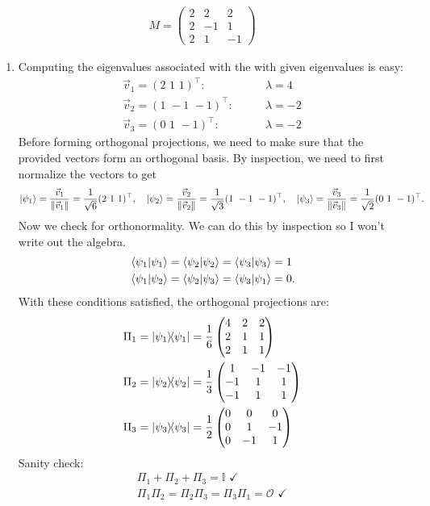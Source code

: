\documentclass{article}
\theoremstyle{definition}
\newcommand{\f}[2]{\frac{#1}{#2}}
\begin{document}
\begin{align*}
	M = \begin{pmatrix}
		2 & 2 & 2 \\
		2 & -1 & 1 \\
		2 & 1 & -1 
	\end{pmatrix}
\end{align*}
\begin{enumerate}[label=(\alph*)]
	\item Computing the eigenvalues associated with the with given eigenvalues is easy:
	\begin{align*}
		\vec{v}_1 = (2\,\,1\,\,1)^\top: &\quad\quad \lambda = 4\\
		\vec{v}_2 = (1\,\,-1\,\,-1)^\top: &\quad\quad \lambda = -2\\
		\vec{v}_3 = (0\,\,1\,\,-1)^\top: &\quad\quad \lambda = -2
	\end{align*}
	Before forming orthogonal projections, we need to make sure that the provided vectors form an orthogonal basis. By inspection, we need to first normalize the vectors to get
	\begin{align*}
		\ket{\psi_1} = \f{\vec{v}_1}{\norm{\vec{v}_1}} = \f{1}{\sqrt{6}}(2\,\,1\,\,1)^\top , 
		\quad \ket{\psi_2} = \f{\vec{v}_2}{\norm{\vec{v}_2}} = \f{1}{\sqrt{3}}  (1\,\,-1\,\,-1)^\top, 
		\quad 
		\ket{\psi_3} = \f{\vec{v}_3}{\norm{\vec{v}_3}} = \f{1}{\sqrt{2}} (0\,\,1\,\,-1)^\top.
	\end{align*}
	Now we check for orthonormality. We can do this by inspection so I won't write out the algebra. 
	\begin{align*}
		&\braket{\psi_1} = \braket{\psi_2} = \braket{\psi_3} = 1\\
		&\bra{\psi_1}\ket{\psi_2} = \bra{\psi_2}\ket{\psi_3} = \bra{\psi_3}\ket{\psi_1} = 0.
	\end{align*}
	With these conditions satisfied, the orthogonal projections are:
	\begin{align*}
		&\Pi_1 = \ketbra{\psi_1} = \f{1}{6}\begin{pmatrix}
			4 & 2 & 2 \\
			2 & 1 & 1\\
			2 & 1 & 1
		\end{pmatrix}\\
		&\Pi_2 = \ketbra{\psi_2} = \f{1}{3}\begin{pmatrix}
			1 & -1 & -1 \\
			-1 & 1 & 1\\
			-1 & 1 & 1
		\end{pmatrix}\\
		&\Pi_3 = \ketbra{\psi_3} = \f{1}{2}\begin{pmatrix}
			0 & 0 & 0 \\
			0 & 1 & -1 \\
			0 & -1 & 1
		\end{pmatrix}
	\end{align*}
	Sanity check:
	\begin{align*}
		\Pi_1 + \Pi_2 + \Pi_3 = \mathbb{I} \,\, \checkmark\\
		\Pi_1 \Pi_2 = \Pi_2 \Pi_3 = \Pi_3 \Pi_1 = \mathcal{O} \,\, \checkmark
	\end{align*}




\end{enumerate}
\end{document}
